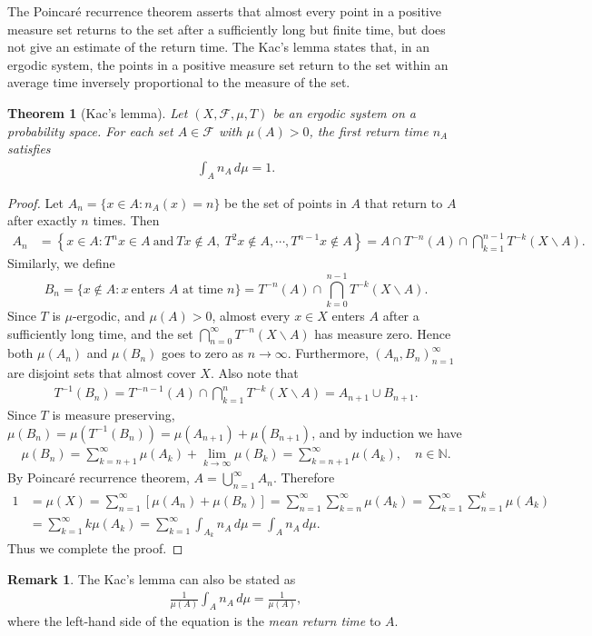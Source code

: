 \documentclass{article}
\numberwithin{equation}{section}
\newcommand{\bbN}{\mathbb{N}}
\newcommand{\scr}{\mathscr}
\theoremstyle{plain}
\newtheorem{theorem}{Theorem}[section]
\theoremstyle{definition}
\newtheorem*{remark}{Remark}
\begin{document}
The Poincaré recurrence theorem asserts that almost every point in a positive measure set returns to the set after a sufficiently long but finite time, but does not give an estimate of the return time. The Kac's lemma states that, in an ergodic system, the points in a positive measure set return to the set within an average time inversely proportional to the measure of the set.
\begin{theorem}[Kac's lemma]
Let $(X,\scr{F},\mu,T)$ be an ergodic system on a probability space. For each set $A\in\scr{F}$ with $\mu(A)>0$, the first return time $n_A$ satisfies
\begin{align*}
	\int_A n_A\,d\mu=1.
\end{align*}
\end{theorem}
\begin{proof}
Let $A_n=\{x\in A:n_A(x)=n\}$ be the set of points in $A$ that return to $A$ after exactly $n$ times. Then
\begin{align*}
	A_n&=\left\{x\in A:T^nx\in A\ \text{and}\ Tx\notin A,\ T^2x\notin A,\cdots,T^{n-1}x\notin A\right\}=A\cap T^{-n}(A)\cap \bigcap_{k=1}^{n-1}T^{-k}(X\backslash A).
\end{align*}
Similarly, we define $$B_n=\{x\notin A: x\ \text{enters $A$ at time $n$}\}=T^{-n}(A)\cap \bigcap_{k=0}^{n-1}T^{-k}(X\backslash A).$$
Since $T$ is $\mu$-ergodic, and $\mu(A)>0$, almost every $x\in X$ enters $A$ after a sufficiently long time, and the set $\bigcap_{n=0}^\infty T^{-n}(X\backslash A)$ has measure zero. Hence both $\mu(A_n)$ and $\mu(B_n)$ goes to zero as $n\to\infty$. Furthermore, $(A_n,B_n)_{n=1}^\infty$ are disjoint sets that almost cover $X$. Also note that
\begin{align*}
	T^{-1}(B_n)=T^{-n-1}(A)\cap \bigcap_{k=1}^{n}T^{-k}(X\backslash A)=A_{n+1}\cup B_{n+1}.
\end{align*}
Since $T$ is measure preserving, $\mu(B_n)=\mu(T^{-1}(B_n))=\mu(A_{n+1})+\mu(B_{n+1})$, and by induction we have
\begin{align*}
	\mu(B_n)=\sum_{k=n+1}^\infty\mu(A_k)+\lim_{k\to\infty}\mu(B_k)=\sum_{k=n+1}^\infty\mu(A_k),\quad n\in\bbN.
\end{align*}
By Poincaré recurrence theorem, $A=\bigcup_{n=1}^\infty A_n$. Therefore
\begin{align*}
	1&=\mu(X)=\sum_{n=1}^\infty\left[\mu(A_n)+\mu(B_n)\right]=\sum_{n=1}^\infty\sum_{k=n}^{\infty}\mu(A_k)=\sum_{k=1}^\infty\sum_{n=1}^{k}\mu(A_k)\\
	&=\sum_{k=1}^\infty k\mu(A_k)=\sum_{k=1}^\infty\int_{A_k}n_A\,d\mu=\int_An_A\,d\mu.
\end{align*}
Thus we complete the proof.
\end{proof}
\begin{remark}
The Kac's lemma can also be stated as
\begin{align*}
	\frac{1}{\mu(A)}\int_A n_A\,d\mu=\frac{1}{\mu(A)},
\end{align*}
where the left-hand side of the equation is the \textit{mean return time} to $A$.
\end{remark}
\end{document}
